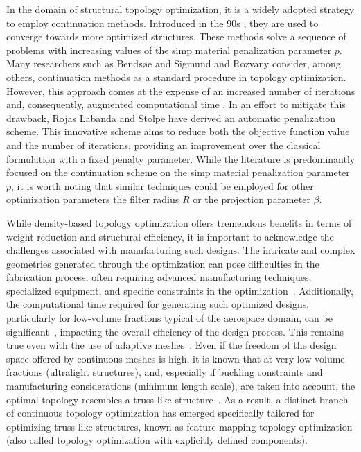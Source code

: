 In the domain of structural topology optimization, it is a widely adopted strategy to employ continuation methods. Introduced in the 90s , they are used to converge towards more optimized structures. These methods solve a sequence of problems with increasing values of the \gls{simp} material penalization parameter $p$. Many researchers such as Bendsøe and Sigmund  and Rozvany  consider, among others, continuation methods as a standard procedure in topology optimization. However, this approach comes at the expense of an increased number of iterations and, consequently, augmented computational time . In an effort to mitigate this drawback, Rojas Labanda and Stolpe  have derived an automatic penalization scheme. This innovative scheme aims to reduce both the objective function value and the number of iterations, providing an improvement over the classical formulation with a fixed penalty parameter. While the literature is predominantly focused on the continuation scheme on the \gls{simp} material penalization parameter $p$, it is worth noting that similar techniques could be employed for other optimization parameters \eg the filter radius $R$ or the projection parameter $\beta$.

While density-based topology optimization offers tremendous benefits in terms of weight reduction and structural efficiency, it is important to acknowledge the challenges associated with manufacturing such designs. The intricate and complex geometries generated through the optimization can pose difficulties in the fabrication process, often requiring advanced manufacturing techniques, specialized equipment, and specific constraints in the optimization~. Additionally, the computational time required for generating such optimized designs, particularly for low-volume fractions typical of the aerospace domain, can be significant~, impacting the overall efficiency of the design process. This remains true even with the use of adaptive meshes~. Even if the freedom of the design space offered by continuous meshes is high, it is known that at very low volume fractions (\eg ultralight structures), and, especially if buckling constraints and manufacturing considerations (\eg minimum length scale), are taken into account, the optimal topology resembles a truss-like structure~. As a result, a distinct branch of continuous topology optimization has emerged specifically tailored for optimizing truss-like structures, known as feature-mapping topology optimization (also called topology optimization with explicitly defined components).

